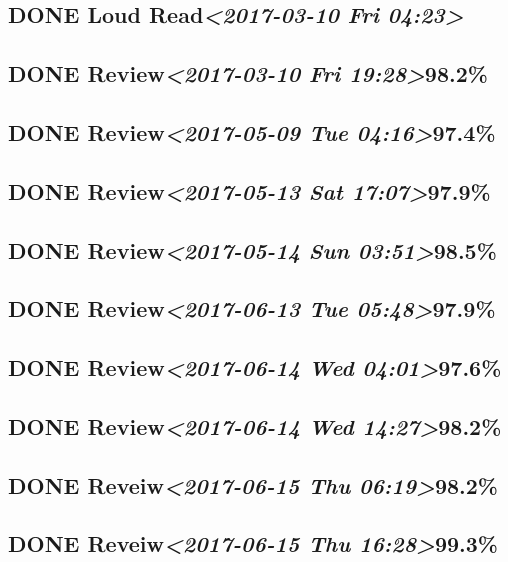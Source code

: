 \documentclass[11pt]{ctexart}
\begin{document}
\subsection{{\bfseries\sffamily DONE} Loud Read\textit{<2017-03-10 Fri 04:23>}}
\label{sec:org4adfcf8}
\subsection{{\bfseries\sffamily DONE} Review\textit{<2017-03-10 Fri 19:28>}98.2\%}
\label{sec:org47183a1}
\subsection{{\bfseries\sffamily DONE} Review\textit{<2017-05-09 Tue 04:16>}97.4\%}
\label{sec:org8ea69c1}
\subsection{{\bfseries\sffamily DONE} Review\textit{<2017-05-13 Sat 17:07>}97.9\%}
\label{sec:org235aaf2}
\subsection{{\bfseries\sffamily DONE} Review\textit{<2017-05-14 Sun 03:51>}98.5\%}
\label{sec:orgf295437}
\subsection{{\bfseries\sffamily DONE} Review\textit{<2017-06-13 Tue 05:48>}97.9\%}
\label{sec:org46c98e5}
\subsection{{\bfseries\sffamily DONE} Review\textit{<2017-06-14 Wed 04:01>}97.6\%}
\label{sec:orgd609a8d}
\subsection{{\bfseries\sffamily DONE} Review\textit{<2017-06-14 Wed 14:27>}98.2\%}
\label{sec:org5ac8edc}
\subsection{{\bfseries\sffamily DONE} Reveiw\textit{<2017-06-15 Thu 06:19>}98.2\%}
\label{sec:orgad98cc7}
\subsection{{\bfseries\sffamily DONE} Reveiw\textit{<2017-06-15 Thu 16:28>}99.3\%}
\label{sec:org3946011}
\end{document}
